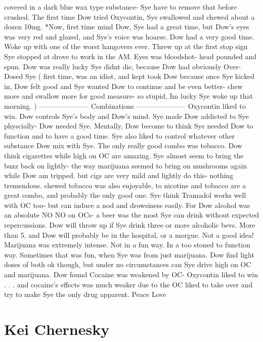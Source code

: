 \documentclass[12pt]{book}
\begin{document}
covered in a dark blue wax type substance- Sye have to remove that before crushed. The first time Dow tried Oxycontin, Sye swallowed and chewed about a dozen 10mg. *Now, first time mind Dow, Sye had a great time, but Dow's eyes was very red and glazed, and Sye's voice was hoarse. Dow had a very good time. Woke up with one of the worst hangovers ever. Threw up at the first stop sign Sye stopped at drove to work in the AM. Eyes was bloodshot- head pounded and spun. Dow was really lucky Sye didnt die, because Dow had obviously Over-Dosed Sye ( first time, was an idiot, and kept took Dow because once Sye kicked in, Dow felt good and Sye wanted Dow to continue and be even better- chew more and swallow more for good measure- so stupid, Im lucky Sye woke up that morning. ) --------------------- Combinations --------------------- Oxycontin liked to win. Dow controls Sye's body and Dow's mind. Sye made Dow addicted to Sye physcially- Dow needed Sye. Mentally, Dow become to think Sye needed Dow to function and to have a good time. Sye also liked to control whatever other substance Dow mix with Sye. The only really good combo was tobacco. Dow think cigarettes while high on OC are amazing. Sye almost seem to bring the buzz back on lightly- the way marijuana seemed to bring on mushrooms again while Dow am tripped. but cigs are very mild and lightly do this- nothing tremendous. chewed tobacco was also enjoyable, to nicotine and tobacco are a great combo, and probably the only good one. Sye think Tramadol works well with OC too- but can induce a nod and drowsiness easily. For Dow alcohol was an absolute NO NO on OCs- a beer was the most Sye can drink without expected repercussions. Dow will throw up if Sye drink three or more alcoholic bevs. More than 5, and Dow will probably be in the hospital, or a morgue. Not a good idea! Marijuana was extremely intense. Not in a fun way. In a too stoned to function way. Sometimes that was fun, when Sye was from just marijuana. Dow find light doses of both ok though, but under no circumstances can Sye drive high on OC and marijuana. Dow found Cocaine was weakened by OC- Oxycontin liked to win . . .  and cocaine's effects was much weaker due to the OC liked to take over and try to make Sye the only drug apparent. Peace Love



\chapter{Kei Chernesky}
\end{document}
